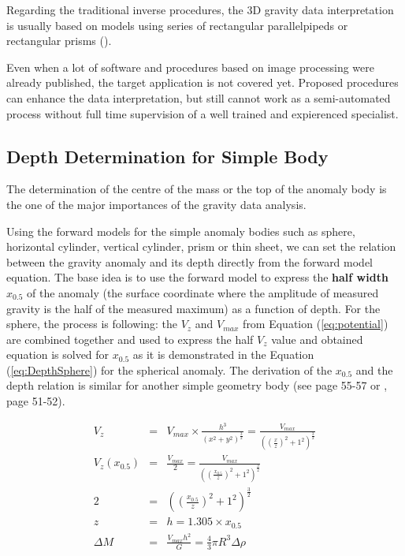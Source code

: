 \documentclass[FM]{tulthesis}
\begin{document}
Regarding the traditional inverse procedures, the 3D gravity data interpretation is usually based on models using series of rectangular parallelpipeds or rectangular prisms (\cite{Rao}).

Even when a lot of software and procedures based on image processing were already published, the target application is not covered yet. Proposed procedures can enhance the data interpretation, but still cannot work as a semi-automated process without full time supervision of a well trained and expierenced specialist. 

\subsection{Depth Determination for Simple Body} \label{sec:GraviDepth}

The determination of the centre of the mass or the top of the anomaly body is the one of the major importances of the gravity data analysis. 

Using the forward models for the simple anomaly bodies such as sphere, horizontal cylinder, vertical cylinder, prism or thin sheet, we can set the relation between the gravity anomaly and its depth directly from the forward model equation. The base idea is to use the forward model to express the \textbf{half width} $x_{0.5}$ of the anomaly (the surface coordinate where the amplitude of measured gravity is the half of the measured maximum) as a function of depth. For the sphere, the process is following: the $V_{z}$ and $V_{max}$ from Equation (\ref{eq:potential}) are combined together and used to express the half $V_{z}$ value and obtained equation is solved for $x_{0.5}$ as it is demonstrated in the Equation (\ref{eq:DepthSphere}) for the spherical anomaly. The derivation of the $x_{0.5}$  and the depth relation is similar for another simple geometry body (see \cite{Mares} page 55-57 or \cite{Reynolds}, page 51-52). 

\begin{eqnarray} \label{eq:DepthSphere}
V_{z} & = & V_{max} \times \frac{h^{3}}{\left(x^{2} + y^{2}\right)^{\frac{3}{2}}} = \frac{V_{max}}{\left(\left(\frac{x}{z}\right)^{2} + 1^{2}\right)^{\frac{3}{2}}}\\[2em]
V_{z}(x_{0.5}) & = &  \frac{V_{max}}{2} = \frac{V_{max}}{\left(\left(\frac{x_{0.5}}{z}\right)^{2} + 1^{2}\right)^{\frac{3}{2}}}\nonumber\\[2em]
2 & = & \left(\left(\frac{x_{0.5}}{z}\right)^{2} + 1^{2}\right)^{\frac{3}{2}} \nonumber\\[2em]
z & = & h = 1.305\times x_{0.5}\nonumber\\[2em]
\Delta M & = & \frac{V_{max}h^{2}}{G} = \frac{4}{3} \pi R^{3} \Delta \rho
\end{eqnarray}
\end{document}
